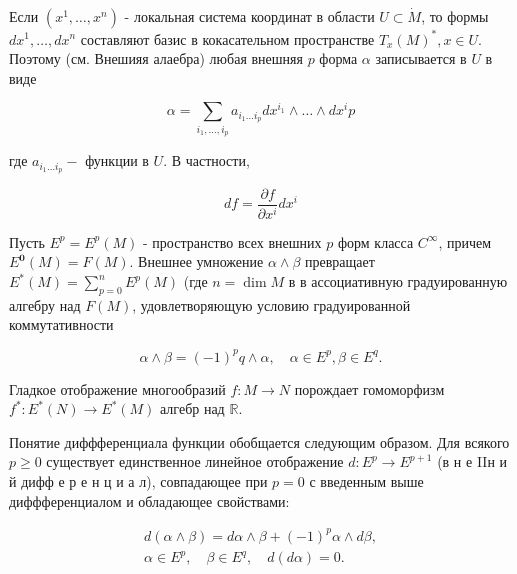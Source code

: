 \documentclass[10pt]{article}
\begin{document}
Если $\left(x^{1}, \ldots, x^{n}\right)$ - локальная система координат в области $U \subset \dot{M}$, то формы $d x^{1}, \ldots, d x^{n}$ составляют базис в кокасательном пространстве $T_{x}(M)^{*}, x \in U$. Поэтому (см. Внешияя алаебра) любая внешняя $p$ форма $\alpha$ записывается в $U$ в виде



\[

\alpha=\sum_{i_{1}, \ldots, i_{p}} a_{i_{1} \ldots i_{p}} d x^{i_{1}} \wedge \ldots \wedge d x^{i} p

\]



где $a_{i_{1} \ldots i_{p}}-$ функции в $U$. В частности,



\[

d f=\frac{\partial f}{\partial x^{i}} d x^{i}

\]



Пусть $E^{p}=E^{p}(M)$ - пространство всех внешних $p$ форм класса $C^{\infty}$, причем $E^{\mathbf{0}}(M)=F(M)$. Внешнее умножение $\alpha \wedge \beta$ превращает $E^{*}(M)=\sum_{p=0}^{n} E^{p}(M)$ (где $n=\operatorname{dim} M$ в в ассоциативную градуированную алгебру над $F(M)$, удовлетворяющую условию градуированной коммутативности



\[

\alpha \wedge \beta=(-1)^{p} q \wedge \alpha, \quad \alpha \in E^{p}, \beta \in E^{q} .

\]



Гладкое отображение многообразий $f: M \rightarrow N$ порождает гомоморфизм $f^{*}: E^{*}(N) \rightarrow E^{*}(M)$ алгебр над $\mathbb{R}$.



Понятие диффференциала функции обобщается следующим образом. Для всякого $p \geqslant 0$ существует единственное линейное отображение $d: E^{p} \rightarrow E^{p+1}$ (в н е IIн и й дифф е р е н ц и а л), совпадающее при $p=0$ с введенным выше диффференциалом и обладающее свойствами:



\[

\begin{gathered}

d(\alpha \wedge \beta)=d \alpha \wedge \beta+(-1)^{p} \alpha \wedge d \beta, \\

\alpha \in E^{p}, \quad \beta \in E^{q}, \quad d(d \alpha)=0 .

\end{gathered}

\]
\end{document}
